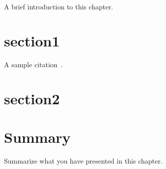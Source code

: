 A brief introduction to this chapter.

\section{section1}
A sample citation~\cite{mapreduce}.

\section{section2}

\section{Summary}
Summarize what you have presented in this chapter.
